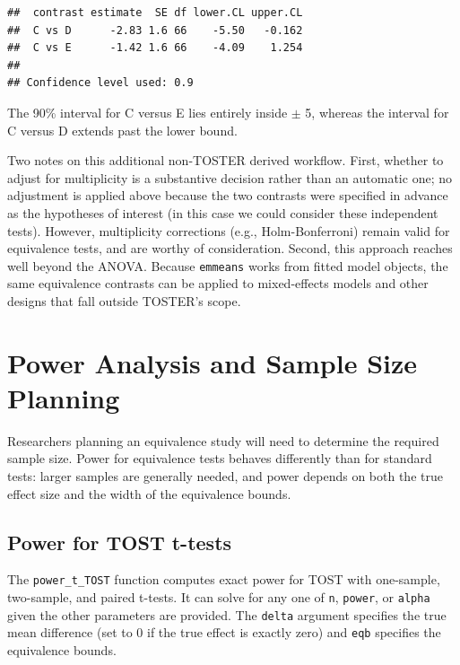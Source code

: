 \documentclass[]{interact}
\theoremstyle{plain}%
\theoremstyle{definition}
\theoremstyle{remark}
\begin{document}
\begin{verbatim}
##  contrast estimate  SE df lower.CL upper.CL
##  C vs D      -2.83 1.6 66    -5.50   -0.162
##  C vs E      -1.42 1.6 66    -4.09    1.254
## 
## Confidence level used: 0.9
\end{verbatim}

The 90\% interval for C versus E lies entirely inside \(\pm\) 5, whereas
the interval for C versus D extends past the lower bound.

Two notes on this additional non-TOSTER derived workflow. First, whether
to adjust for multiplicity is a substantive decision rather than an
automatic one; no adjustment is applied above because the two contrasts
were specified in advance as the hypotheses of interest (in this case we
could consider these independent tests). However, multiplicity
corrections (e.g., Holm-Bonferroni) remain valid for equivalence tests,
and are worthy of consideration. Second, this approach reaches well
beyond the ANOVA. Because \texttt{emmeans} works from fitted model
objects, the same equivalence contrasts can be applied to mixed-effects
models and other designs that fall outside TOSTER's scope.

\newpage

\section{Power Analysis and Sample Size
Planning}\label{power-analysis-and-sample-size-planning}

Researchers planning an equivalence study will need to determine the
required sample size. Power for equivalence tests behaves differently
than for standard tests: larger samples are generally needed, and power
depends on both the true effect size and the width of the equivalence
bounds.

\subsection{Power for TOST t-tests}\label{power-for-tost-t-tests}

The \texttt{power\_t\_TOST} function computes exact power for TOST with
one-sample, two-sample, and paired t-tests. It can solve for any one of
\texttt{n}, \texttt{power}, or \texttt{alpha} given the other parameters
are provided. The \texttt{delta} argument specifies the true mean
difference (set to 0 if the true effect is exactly zero) and
\texttt{eqb} specifies the equivalence bounds.
\end{document}
